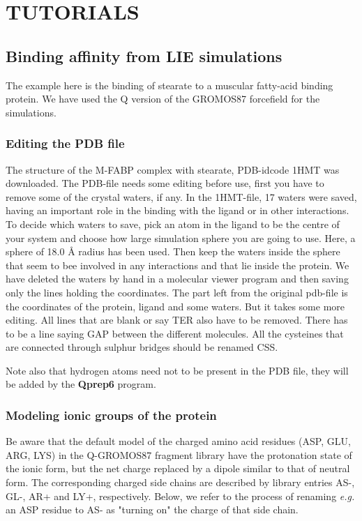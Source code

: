 \documentclass[a4paper,11pt]{article}
\begin{document}
\section{TUTORIALS}
\subsection{Binding affinity from LIE simulations}
The example here  is the binding of stearate to  a muscular fatty-acid
binding protein. We have used the Q version of the GROMOS87 forcefield
for the simulations.

\subsubsection{Editing the PDB file}
The structure of the M-FABP complex with stearate, PDB-idcode 1HMT was
downloaded. The PDB-file needs some editing before use, first you have
to remove  some of the  crystal waters, if  any. In the  1HMT-file, 17
waters were  saved, having an important  role in the binding  with the
ligand or in other interactions. To  decide which waters to save, pick
an atom in the  ligand to be the centre of your  system and choose how
large simulation sphere  you are going to use. Here,  a sphere of 18.0
{\AA} radius  has been used.  Then keep  the waters inside  the sphere
that seem to bee involved in  any interactions and that lie inside the
protein. We  have deleted  the waters  by hand  in a  molecular viewer
program and  then saving only  the lines holding the  coordinates. The
part  left  from the  original  pdb-file  is  the coordinates  of  the
protein, ligand and  some waters. But it takes some  more editing. All
lines that are blank or say TER  also have to be removed. There has to
be  a  line  saying  GAP  between the  different  molecules.  All  the
cysteines that are connected through sulphur bridges should be renamed
CSS.

Note also that hydrogen atoms need not  to be present in the PDB file,
they will be added by the \textbf{Qprep6} program.

\subsubsection{Modeling ionic groups of the protein}
Be aware  that the default  model of  the charged amino  acid residues
(ASP,  GLU, ARG,  LYS) in  the  Q-GROMOS87 fragment  library have  the
protonation state of the ionic form,  but the net charge replaced by a
dipole similar to that of neutral form. The corresponding charged side
chains  are  described by  library  entries  AS-,  GL-, AR+  and  LY+,
respectively. Below, we  refer to the process  of renaming \emph{e.g.}
an ASP residue to AS- as "turning on" the charge of that side chain.
\end{document}
